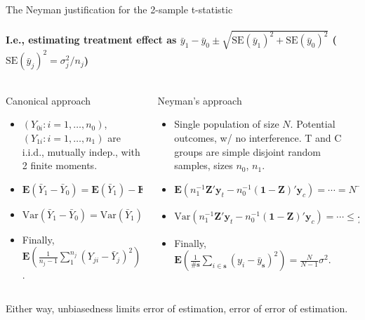 \begin{frame}{The Neyman justification for the 2-sample t-statistic} \pause
 \framesubtitle{I.e., estimating treatment effect as %
$\bar{y}_{1} - \bar{y}_0   \pm \sqrt{\mathrm{SE}(\bar{y}_{1})^{2} +
  \mathrm{SE}(\bar{y}_{0}) ^{2}}$ ($\mathrm{SE}(\bar{y}_{j})^{2} = \sigma_{j}^{2}/n_{j} $) }
\pause

\begin{columns}
  \begin{Column}
    { Canonical approach}  
    \begin{itemize}[<+->]
    \item $(Y_{0i}: i=1, \ldots, n_{0})  $, $(Y_{1i}: i=1, \ldots, n_{1})  $ are
i.i.d., mutually indep., with 2 finite moments. 
    \item $\mathbf{E}(\bar{Y}_{1} - \bar{Y}_{0}) =
      \mathbf{E}(\bar{Y}_{1}) - \mathbf{E}(\bar{Y}_{0}) = \mu_{1} - \mu_{0}$
    \item $\mathrm{Var}(\bar{Y}_{1} - \bar{Y}_{0}) =
      \mathrm{Var}(\bar{Y}_{1}) + \mathrm{Var}(\bar{Y}_{0}) =
      \sigma_{1}/n_{1} + \sigma_{0}/n_{0}$
    \item Finally, $\mathbf{E}(\frac{1}{n_{j}-1} \sum_{1}^{n_{j}}
      (Y_{ji} - \bar{Y}_{j} )^{2}) = \sigma^{2}_{i}$.
    \end{itemize}
 \end{Column}
  \begin{Column}
    { Neyman's approach}  
    \begin{itemize}[<+->]
    \item Single population of size $N$. Potential outcomes, w/ no
  interference.  T and C groups are simple
   disjoint random samples, sizes $n_{0}$, $n_{1}$.
 \item $\mathbf{E}(n_{1}^{-1}\mathbf{Z}'\mathbf{y}_{t} - n_{0}^{-1}(\mathbf{1}-
   \mathbf{Z})'\mathbf{y}_{c} ) = \cdots = N^{-1}\sum_{1}^{N} y_{ti} -
   N^{-1}\sum_{1}^{N} y_{ci}$
   \item $\mathrm{Var}(n_{1}^{-1}\mathbf{Z}'\mathbf{y}_{t} - n_{0}^{-1}(\mathbf{1}-
   \mathbf{Z})'\mathbf{y}_{c} ) = \cdots \leq \frac{N}{N-1}
   \left(\frac{\sigma_{1}^{2}}{n_{1}}  +
     \frac{\sigma_{0}^{2}}{n_{0}}\right)$     
\item Finally, $\mathbf{E}(\frac{1}{\# \mathbf{s}} \sum_{i \in \mathbf{s}}
      (y_{i} - \bar{y}_{\mathbf{s}} )^{2}) = \frac{N}{N-1}\sigma^{2}$.

    \end{itemize}
 \end{Column}
\end{columns}
\pause
Either way, unbiasedness limits error of estimation, error of error of estimation. 
\end{frame}

